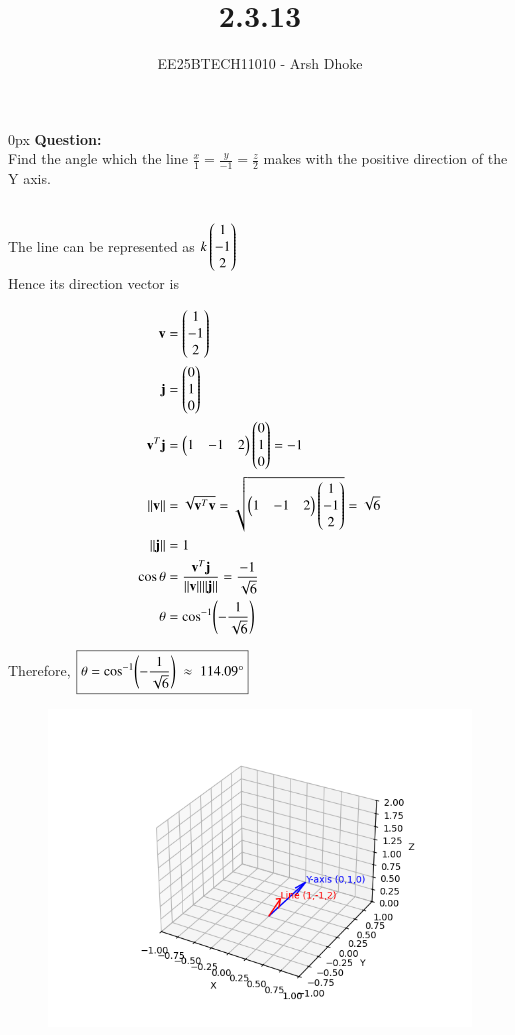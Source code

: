 \documentclass[journal]{IEEEtran}
\begin{document}

\vspace{3cm}

\title{2.3.13}
\author{EE25BTECH11010 - Arsh Dhoke}
{\let\newpage\relax\maketitle}

\renewcommand{\thefigure}{\theenumi}
\renewcommand{\thetable}{\theenumi}
\setlength{\intextsep}{10pt}
\renewcommand{\thetable}{\theenumi}

\parindent 0px
\textbf{Question:} \\
Find the angle which the line $\frac{x}{1}=\frac{y}{-1}=\frac{z}{2}$ makes with the positive direction of the Y axis.

\solution \\

The line can be represented as
$k \begin{pmatrix}1\\-1\\2\end{pmatrix}$ 
\\

Hence its direction vector is

\begin{align}
\mathbf{v} &= \begin{pmatrix}1\\-1\\2\end{pmatrix} \\
\mathbf{j} &= \begin{pmatrix}0\\1\\0\end{pmatrix} \\
\mathbf{v}^T\mathbf{j} &= 
\begin{pmatrix}1 & -1 & 2\end{pmatrix}\begin{pmatrix}0\\1\\0\end{pmatrix}=-1 \\
\|\mathbf{v}\| &= 
\sqrt{\mathbf{v}^T\mathbf{v}}
=\sqrt{\begin{pmatrix}1 & -1 & 2\end{pmatrix}\begin{pmatrix}1\\-1\\2\end{pmatrix}}=\sqrt{6} \\
\|\mathbf{j}\| &=1 \\
\cos\theta &= 
\frac{\mathbf{v}^T\mathbf{j}}{\|\mathbf{v}\|\|\mathbf{j}\|}
=\frac{-1}{\sqrt{6}} \\
\theta &= \cos^{-1}\!\left(-\frac{1}{\sqrt{6}}\right)
\end{align}

Therefore,
$
\boxed{\theta=\cos^{-1}\!\left(-\frac{1}{\sqrt{6}}\right)\;\approx\;114.09\degree}
$

\begin{figure}[ht!]
\centering
\includegraphics[height=0.6\textheight, keepaspectratio]{figs/q3.png}
\end{figure}
\end{document}
